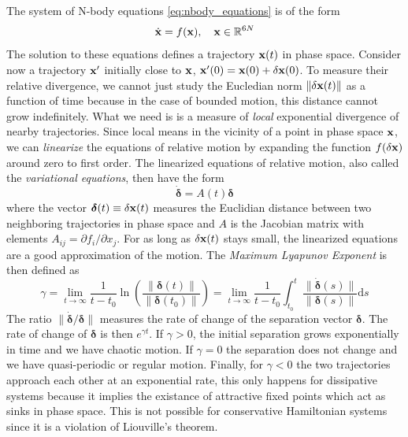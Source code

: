 \documentclass[ twoside,openright,titlepage,numbers=noenddot,headinclude,%
                footinclude=true,cleardoublepage=empty,abstractoff, %
                BCOR=5mm,paper=a4,fontsize=11pt,%
                american,%
                ]{scrreprt}
\begin{document}
The system of N-body equations \cref{eq:nbody_equations} is of the form
\begin{equation}
    \dot{\boldsymbol{\mathbf{x}}}=f(\boldsymbol{\mathbf{x}}),\quad\boldsymbol{\mathbf{x}}\in\mathbb{R}^{6N}
    \label{eq:nbody_eq_general}
\end{equation}
The solution to these equations defines a trajectory $\boldsymbol{\mathbf{x}}(t)$ in phase space.
Consider now a trajectory $\boldsymbol{\mathbf{x}}'$ initially close to $\boldsymbol{\mathbf{x}}$,
$\boldsymbol{\mathbf{x}}'(0)=\boldsymbol{\mathbf{x}}(0)+\delta\boldsymbol{\mathbf{x}}(0)$. To measure their relative divergence,
we cannot just study the Eucledian norm $\lVert \delta\boldsymbol{\mathbf{x}}(t)\rVert$ as 
a function of time because in the case of bounded motion, this distance cannot
grow indefinitely. What we need is is a measure of \emph{local} exponential
divergence of nearby trajectories. Since local means in the vicinity of a point
in phase space $\boldsymbol{\mathbf{x}}$, we can \emph{linearize} the equations
of relative motion by expanding the function $f(\delta\boldsymbol{\mathbf{x}})$ around
zero to first order. The linearized equations of relative motion, also called
the \emph{variational equations}, then have the form
\begin{equation}
    \dot{\boldsymbol{\delta}}=A(t)\boldsymbol{\delta}
    \label{eq:variational_equations}
\end{equation}
where the vector $\boldsymbol{\delta}(t)\equiv\delta\boldsymbol{\mathbf{x}}(t)$ measures the
Euclidian distance between two neighboring trajectories in phase space
and $A$ is the Jacobian matrix with elements $A_{ij}=\partial f_i/\partial x_j$.
For as long as $\delta\boldsymbol{\mathbf{x}}(t)$
stays small, the linearized equations are a good approximation of the motion. The
\emph{Maximum Lyapunov Exponent} is then defined as \citep{Hinse2010,morbidelli2002}
\begin{equation}
    \gamma=\lim_{t\rightarrow\infty} \frac{1}{t-t_0} \ln\left( \frac{\lVert 
    \boldsymbol{\delta}(t)\rVert}{\lVert \boldsymbol{\delta}(t_0)\rVert}\right)=
    \lim_{t\rightarrow\infty} \frac{1}{t-t_0}\int^t_{t_0} 
    \frac{\lVert \dot{\boldsymbol{\delta}}(s)\rVert}{\lVert 
    \boldsymbol{\delta}(s)\rVert}\mathrm{d}s
\end{equation}
 The ratio $\lVert\dot{\boldsymbol{\delta}}/ \boldsymbol{\delta}\rVert$ measures the
rate of change of the separation vector $\boldsymbol{\delta}$. The rate of change
of $\boldsymbol{\delta}$ is then $e^{\gamma t}$. If $\gamma >0$, the initial separation
grows exponentially in time and we have chaotic motion. If $\gamma=0$ the separation
does not change and we have quasi-periodic or regular motion. Finally, for $\gamma<0$
the two trajectories approach each other at an exponential rate, this only happens
for dissipative systems because it implies the existance of attractive fixed points which
act as sinks in phase space. This is not possible for conservative Hamiltonian
systems since it is a violation of Liouville's theorem. 
\end{document}

